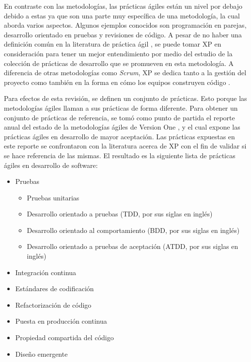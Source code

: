 En contraste con las metodologías, las prácticas ágiles están un nivel por debajo debido a estas ya que son una parte muy específica de una metodología, la cual aborda varios aspectos. Algunos ejemplos conocidos son programación en parejas, desarrollo orientado en pruebas y revisiones de código. A pesar de no haber una definición común en la literatura de práctica ágil \cite{diebold-dahlem}, se puede tomar XP en consideración para tener un mejor entendimiento por medio del estudio de la colección de prácticas de desarrollo que se promueven en esta metodología. A diferencia de otras metodologías como \emph{Scrum}, XP se dedica tanto a la gestión del proyecto como también en la forma en cómo los equipos construyen código \cite{shore-warden}.

Para efectos de esta revisión, se definen un conjunto de prácticas. Esto porque las metodologías ágiles llaman a sus prácticas de forma diferente. Para obtener un conjunto de prácticas de referencia, se tomó como punto de partida el reporte anual del estado de la metodologías ágiles de Version One \cite{version-one}, y el cual expone las prácticas ágiles en desarrollo de mayor aceptación. Las prácticas expuestas en este reporte se confrontaron con la literatura acerca de XP \cite{beck-andres, ford, shore-warden} con el fin de validar si se hace referencia de las mismas. El resultado es la siguiente lista de prácticas ágiles en desarrollo de software:
\begin{itemize}
    \item Pruebas
        \begin{itemize}
            \item Pruebas unitarias
            \item Desarrollo orientado a pruebas (TDD, por sus siglas en inglés)
            \item Desarrollo orientado al comportamiento (BDD, por sus siglas en inglés)
            \item Desarrollo orientado a pruebas de aceptación (ATDD, por sus siglas en inglés)
        \end{itemize}
        \item Integración continua
        \item Estándares de codificación
        \item Refactorización de código
        \item Puesta en producción continua
        \item Propiedad compartida del código
        \item Diseño emergente
\end{itemize}


